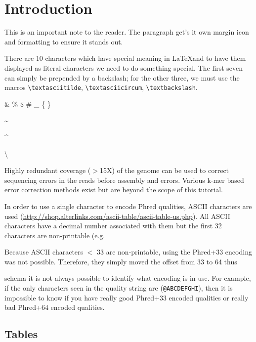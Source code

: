 \newpage

\section{Introduction}

\begin{note}
This is an important note to the reader. The paragraph get's it own margin icon and formatting to
ensure it stands out.
\end{note}

There are 10 characters which have special meaning in \LaTeX and to have them displayed as literal
characters we need to do something special. The first seven can simply be prepended by a backslash;
for the other three, we must use the macros \verb+\textasciitilde+, \verb+\textasciicircum+,
\verb+\textbackslash+.


\& \% \$ \# \_ \{ \}

\textasciitilde

\textasciicircum

\textbackslash

Highly redundant coverage ($>$15X) of the genome can be used to correct sequencing
errors in the reads before assembly and errors. Various k-mer based error
correction methods exist but are beyond the scope of this tutorial.

In order to use a single character to encode Phred qualities, ASCII characters
are used (\url{http://shop.alterlinks.com/ascii-table/ascii-table-us.php}). All ASCII characters have a decimal
number associated with them but the first 32 characters are non-printable (e.g.

Because ASCII characters $<$ 33 are non-printable, using the Phred+33 encoding was
not possible. Therefore, they simply moved the offset from 33 to 64 thus

schema it is not always possible to identify what encoding is in use. For
example, if the only characters seen in the quality string are (\texttt{@ABCDEFGHI}),
then it is impossible to know if you have really good Phred+33 encoded qualities
or really bad Phred+64 encoded qualities.

\subsection{Tables}

